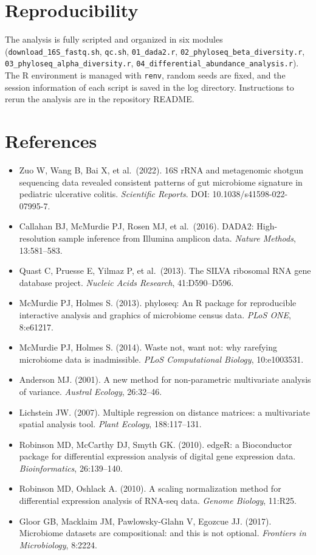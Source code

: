 \documentclass[
  letterpaper,
  DIV=11,
  numbers=noendperiod]{scrartcl}
\providecommand{\tightlist}{%
  \setlength{\itemsep}{0pt}\setlength{\parskip}{0pt}}
\begin{document}
\section{Reproducibility}\label{reproducibility}

The analysis is fully scripted and organized in six modules
(\texttt{download\_16S\_fastq.sh}, \texttt{qc.sh}, \texttt{01\_dada2.r},
\texttt{02\_phyloseq\_beta\_diversity.r},
\texttt{03\_phyloseq\_alpha\_diversity.r},
\texttt{04\_differential\_abundance\_analysis.r}). The R environment is
managed with \texttt{renv}, random seeds are fixed, and the session
information of each script is saved in the log directory. Instructions
to rerun the analysis are in the repository README.

\section{References}\label{references}

\begin{itemize}
\tightlist
\item
  Zuo W, Wang B, Bai X, et al.~(2022). 16S rRNA and metagenomic shotgun
  sequencing data revealed consistent patterns of gut microbiome
  signature in pediatric ulcerative colitis. \emph{Scientific Reports}.
  DOI: 10.1038/s41598-022-07995-7.
\item
  Callahan BJ, McMurdie PJ, Rosen MJ, et al.~(2016). DADA2:
  High-resolution sample inference from Illumina amplicon data.
  \emph{Nature Methods}, 13:581--583.
\item
  Quast C, Pruesse E, Yilmaz P, et al.~(2013). The SILVA ribosomal RNA
  gene database project. \emph{Nucleic Acids Research}, 41:D590--D596.
\item
  McMurdie PJ, Holmes S. (2013). phyloseq: An R package for reproducible
  interactive analysis and graphics of microbiome census data.
  \emph{PLoS ONE}, 8:e61217.
\item
  McMurdie PJ, Holmes S. (2014). Waste not, want not: why rarefying
  microbiome data is inadmissible. \emph{PLoS Computational Biology},
  10:e1003531.
\item
  Anderson MJ. (2001). A new method for non-parametric multivariate
  analysis of variance. \emph{Austral Ecology}, 26:32--46.
\item
  Lichstein JW. (2007). Multiple regression on distance matrices: a
  multivariate spatial analysis tool. \emph{Plant Ecology},
  188:117--131.
\item
  Robinson MD, McCarthy DJ, Smyth GK. (2010). edgeR: a Bioconductor
  package for differential expression analysis of digital gene
  expression data. \emph{Bioinformatics}, 26:139--140.
\item
  Robinson MD, Oshlack A. (2010). A scaling normalization method for
  differential expression analysis of RNA-seq data. \emph{Genome
  Biology}, 11:R25.
\item
  Gloor GB, Macklaim JM, Pawlowsky-Glahn V, Egozcue JJ. (2017).
  Microbiome datasets are compositional: and this is not optional.
  \emph{Frontiers in Microbiology}, 8:2224.
\end{itemize}
\end{document}
